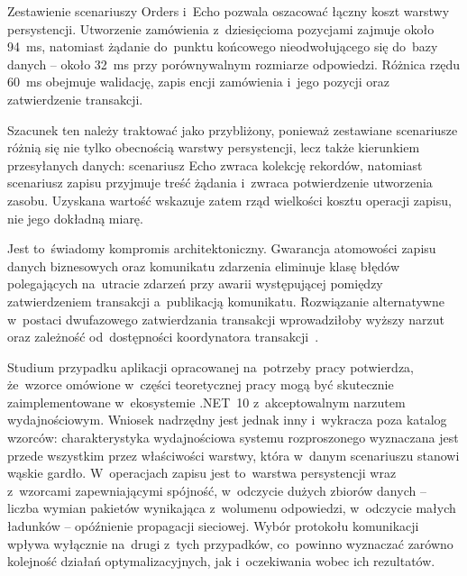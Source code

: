 Zestawienie scenariuszy Orders i~Echo pozwala oszacować łączny koszt warstwy persystencji. Utworzenie zamówienia z~dziesięcioma pozycjami zajmuje około 94~ms, natomiast żądanie do~punktu końcowego nieodwołującego się do~bazy danych -- około 32~ms przy porównywalnym rozmiarze odpowiedzi. Różnica rzędu 60~ms obejmuje walidację, zapis encji zamówienia i~jego pozycji oraz zatwierdzenie transakcji.

Szacunek ten należy traktować jako przybliżony, ponieważ zestawiane scenariusze różnią się nie tylko obecnością warstwy persystencji, lecz także kierunkiem przesyłanych danych: scenariusz Echo zwraca kolekcję rekordów, natomiast scenariusz zapisu przyjmuje treść żądania i~zwraca potwierdzenie utworzenia zasobu. Uzyskana wartość wskazuje zatem rząd wielkości kosztu operacji zapisu, nie jego dokładną miarę.

Jest to~świadomy kompromis architektoniczny. Gwarancja atomowości zapisu danych biznesowych oraz komunikatu zdarzenia eliminuje klasę błędów polegających na~utracie zdarzeń przy awarii występującej pomiędzy zatwierdzeniem transakcji a~publikacją komunikatu. Rozwiązanie alternatywne w~postaci dwufazowego zatwierdzania transakcji wprowadziłoby wyższy narzut oraz zależność od~dostępności koordynatora transakcji~\cite{bib:Richardson2018}.

Studium przypadku aplikacji opracowanej na~potrzeby pracy potwierdza, że~wzorce omówione w~części teoretycznej pracy mogą być skutecznie zaimplementowane w~ekosystemie .NET~10 z~akceptowalnym narzutem wydajnościowym. Wniosek nadrzędny jest jednak inny i~wykracza poza katalog wzorców: charakterystyka wydajnościowa systemu rozproszonego wyznaczana jest przede wszystkim przez właściwości warstwy, która w~danym scenariuszu stanowi wąskie gardło. W~operacjach zapisu jest to~warstwa persystencji wraz z~wzorcami zapewniającymi spójność, w~odczycie dużych zbiorów danych -- liczba wymian pakietów wynikająca z~wolumenu odpowiedzi, w~odczycie małych ładunków -- opóźnienie propagacji sieciowej. Wybór protokołu komunikacji wpływa wyłącznie na~drugi z~tych przypadków, co~powinno wyznaczać zarówno kolejność działań optymalizacyjnych, jak i~oczekiwania wobec ich rezultatów.
